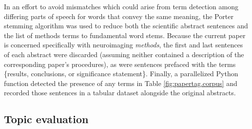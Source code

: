 


In an effort to avoid mismatches which could arise from term detection among differing parts of speech for words that convey the same meaning, the Porter stemming algorithm \cite{M.F.Porter1980} was used to reduce both the scientific abstract sentences and the list of methods terms to fundamental word stems. Because the current paper is concerned specifically with neuroimaging \emph{methods}, the first and last sentences of each abstract were discarded (assuming neither contained a description of the corresponding paper's procedures), as were sentences prefaced with the terms \{results, conclusions, or significance statement\}. Finally, a parallelized Python function detected the presence of any terms in Table \ref{fig:papertag.corpus} and recorded those sentences in a tabular dataset alongside the original abstracts. 

\subsection{Topic evaluation}

